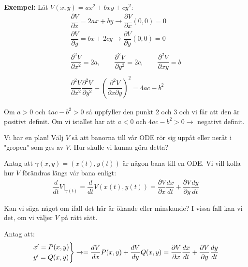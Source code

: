 \par\bigskip
\noindent\textbf{Exempel:} Låt $V(x,y)=ax^2+bxy+cy^2$:
\begin{equation*}
  \begin{gathered}
    \dfrac{\partial V}{\partial x} = 2ax+by\rightarrow \dfrac{\partial V}{\partial x}(0,0)=0\\
    \dfrac{\partial V}{\partial y}=bx+2cy\rightarrow\dfrac{\partial V}{\partial y}(0,0)=0\\\\
    \dfrac{\partial^2V}{\partial x^2}=2a,\qquad\dfrac{\partial^2V}{\partial y^2}=2c,\qquad\dfrac{\partial^2V}{\partial xy}=b\\\\
    \dfrac{\partial^2V}{\partial x^2}\dfrac{\partial^2V}{\partial y^2}-\left(\dfrac{\partial^2V}{\partial x\partial y}\right)^2 = 4ac-b^2
  \end{gathered}
\end{equation*}
\par\bigskip
\noindent Om $a>0$ och $4ac-b^2>0$ så uppfyller den punkt 2 och 3 och vi får att den är positivt definit. Om vi istället har att $a<0$ och $4ac-b^2>0\rightarrow$ negativt definit.
\par\bigskip
\noindent Vi har en plan! Välj $V$ så att banorna till vår ODE rör sig uppåt eller neråt i "gropen" som ges av $V$. Hur skulle vi kunna göra detta?\par
\noindent Antag att $\gamma(x,y) = (x(t),y(t))$ är någon bana till en ODE. Vi vill kolla hur $V$ förändras längs vår bana enligt:
\begin{equation*}
  \begin{gathered}
    \dfrac{d}{dt}V|_{\gamma(t)} = \dfrac{d}{dt}V(x(t),y(t)) = \dfrac{\partial V}{\partial x}\dfrac{dx}{dt}+\dfrac{\partial V}{\partial y}\dfrac{dy}{dt}
  \end{gathered}
\end{equation*}
\par\bigskip
\noindent Kan vi säga något om ifall det här är ökande eller minskande? I vissa fall kan vi det, om vi väljer $V$ på rätt sätt.
\par\bigskip
\noindent Antag att:
\begin{equation*}
  \begin{gathered}
    \begin{rcases*}
      x^{\prime} = P(x,y)\\
      y^{\prime} = Q(x,y)
    \end{rcases*}\rightarrow = \dfrac{dV}{dx}P(x,y)+\dfrac{dV}{dy}Q(x,y) = \dfrac{\partial V}{\partial x}\dfrac{dx}{dt}+\dfrac{\partial V}{\partial y}\dfrac{dy}{dt}
  \end{gathered}
\end{equation*}
